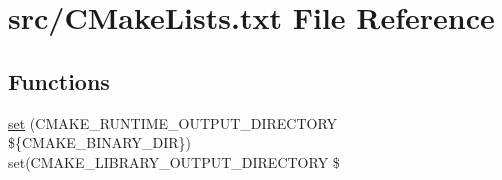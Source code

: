 \hypertarget{CMakeLists_8txt}{}\section{src/\+C\+Make\+Lists.txt File Reference}
\label{CMakeLists_8txt}
\subsection*{Functions}
\begin{DoxyCompactItemize}
\item 
\hyperlink{CMakeLists_8txt_a7e11ef212fac7011566e470dececbcd8}{set} (C\+M\+A\+K\+E\+\_\+\+R\+U\+N\+T\+I\+M\+E\+\_\+\+O\+U\+T\+P\+U\+T\+\_\+\+D\+I\+R\+E\+C\+T\+O\+RY \$\{C\+M\+A\+K\+E\+\_\+\+B\+I\+N\+A\+R\+Y\+\_\+\+D\+IR\}) set(C\+M\+A\+K\+E\+\_\+\+L\+I\+B\+R\+A\+R\+Y\+\_\+\+O\+U\+T\+P\+U\+T\+\_\+\+D\+I\+R\+E\+C\+T\+O\+RY \$
\item 

\end{DoxyCompactItemize}
